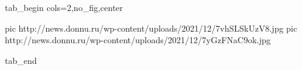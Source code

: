  
 
 
 
 


\ifcmt
  tab_begin cols=2,no_fig,center

     pic http://news.donnu.ru/wp-content/uploads/2021/12/7vhSLSkUzV8.jpg
		 pic http://news.donnu.ru/wp-content/uploads/2021/12/7yGzFNaC9ok.jpg

  tab_end
\fi

